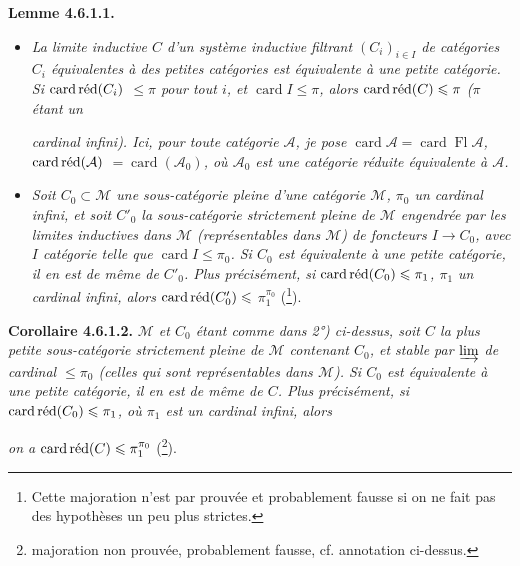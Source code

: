 \textbf{Lemme 4.6.1.1.}
\begin{itemize}[leftmargin=2.5em]
\item[\textit{1°)}] \textit{La limite inductive $C$ d'un système inductive filtrant $(C_i)_{i\in I}$ de catégories $C_i$ équivalentes à des petites catégories est équivalente à une petite catégorie. Si $\cardred(C_i)$ $\leqslant\pi$ pour tout $i$, et $\operatorname{card}I\leqslant\pi$, alors $\cardred(C)\leqslant\pi$ ($\pi$ étant un} %


\textit{cardinal infini). Ici, pour toute catégorie $\mathcal{A}$, je pose $\operatorname{card}\mathcal{A}=\operatorname{card}\operatorname{Fl}\mathcal{A}$, $\cardred(\mathcal{A})$ $=\operatorname{card}(\mathcal{A}_0)$, où $\mathcal{A}_0$ est une catégorie réduite équivalente à $\mathcal{A}$.}
\item[\textit{2°)}] \textit{Soit $C_0\subset\mathcal{M}$ une sous-catégorie pleine d'une catégorie $\mathcal{M}$, $\pi_0$ un cardinal infini, et soit $C'_0$ la sous-catégorie strictement pleine de $\mathcal{M}$ engendrée par les limites inductives dans $\mathcal{M}$ (représentables dans $\mathcal{M}$) de foncteurs $I\longrightarrow C_0$, avec $I$ catégorie telle que $\operatorname{card}I\leqslant\pi_0$. Si $C_0$ est équivalente à une petite catégorie, il en est de même de $C'_0$. Plus précisément, si $\cardred(C_0)\leqslant\pi_1$, $\pi_1$ un cardinal infini, alors $\cardred(C'_0)\leqslant$ $\pi_1^{\pi_0}$} (\footnote[56]{Cette majoration n'est par prouvée et probablement fausse si on ne fait pas des hypothèses un peu plus strictes.}). %
\end{itemize}

\textbf{Corollaire 4.6.1.2.} \textit{$\mathcal{M}$ et $C_0$ étant comme dans 2°) ci-dessus, soit $C$ la plus petite sous-catégorie strictement pleine de $\mathcal{M}$ contenant $C_0$, et stable par $\varinjlim$ de cardinal $\leqslant\pi_0$ (celles qui sont représentables dans $\mathcal{M}$). Si $C_0$ est équivalente à une petite catégorie, il en est de même de $C$. Plus précisément, si $\cardred(C_0)\leqslant\pi_1$, où $\pi_1$ est un cardinal infini, alors}


\textit{on a $\cardred(C)\leqslant\pi_1^{\pi_0}$} (\footnote[57]{majoration non prouvée, probablement fausse, cf. annotation ci-dessus.}).

